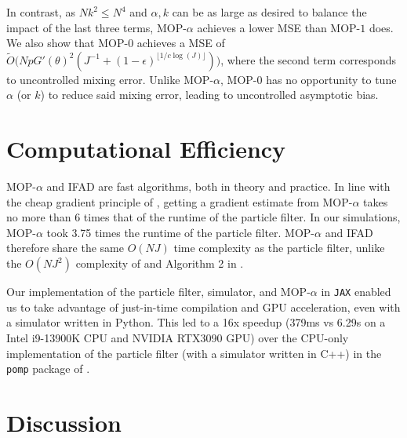 \documentclass[9pt,twocolumn,pnasresearcharticle]{pnas-new}
\newcommand\arxiv[2]{#2} %
\begin{document}
In contrast, as $Nk^2 \leq N^4$ and $\alpha, k$ can be as large as desired to balance the impact of the last three terms, MOP-$\alpha$ achieves a lower MSE than MOP-$1$ does. We also show that MOP-$0$ achieves a MSE of $\tilde{O}\big(NpG'(\theta)^2(J^{-1}+(1-\epsilon)^{\lfloor1/c\log(J)\rfloor})\big)$, where the second term corresponds to uncontrolled mixing error. Unlike MOP-$\alpha$, MOP-$0$ has no opportunity to tune $\alpha$ (or $k$) to reduce said mixing error, leading to uncontrolled asymptotic bias. 


\arxiv{}{\vspace*{-2mm}}
\section{Computational Efficiency}

MOP-$\alpha$ and IFAD are fast algorithms, both in theory and practice. 
In line with the cheap gradient principle of \cite{kakade2019provably}, getting a gradient estimate from MOP-$\alpha$ takes no more than 6 times that of the runtime of the particle filter. In our simulations, MOP-$\alpha$ took 3.75 times the runtime of the particle filter. 
MOP-$\alpha$ and IFAD therefore share the same $O(NJ)$ time complexity as the particle filter, unlike the $O(NJ^2)$ complexity of \cite{corenflos21} and Algorithm 2 in \cite{poyiadjis11, scibior21}.



Our implementation of the particle filter, simulator, and MOP-$\alpha$ in \texttt{JAX} \cite{jax} enabled us to take advantage of just-in-time compilation and GPU acceleration, even with a simulator written in Python. This led to a 16x speedup (379ms vs 6.29s on a Intel i9-13900K CPU and NVIDIA RTX3090 GPU) over the CPU-only implementation of the particle filter (with a simulator written in C++) in the \texttt{pomp} package of \cite{king16}. 





\arxiv{}{\vspace*{-2mm}}
\section{Discussion}
\end{document}
